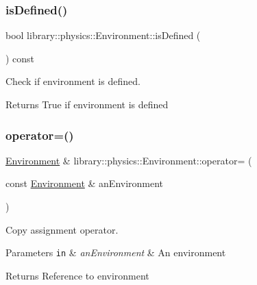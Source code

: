 \subsubsection{\texorpdfstring{is\+Defined()}{isDefined()}}
{\footnotesize\ttfamily bool library\+::physics\+::\+Environment\+::is\+Defined (\begin{DoxyParamCaption}{ }\end{DoxyParamCaption}) const}



Check if environment is defined. 

\begin{DoxyReturn}{Returns}
True if environment is defined 
\end{DoxyReturn}
\mbox{\label{classlibrary_1_1physics_1_1_environment_a3410b331642161ad087d76b7d5019a86}} 
\subsubsection{\texorpdfstring{operator=()}{operator=()}}
{\footnotesize\ttfamily \hyperlink{classlibrary_1_1physics_1_1_environment}{Environment} \& library\+::physics\+::\+Environment\+::operator= (\begin{DoxyParamCaption}\item[{const \hyperlink{classlibrary_1_1physics_1_1_environment}{Environment} \&}]{an\+Environment }\end{DoxyParamCaption})}



Copy assignment operator. 


\begin{DoxyParams}[1]{Parameters}
\mbox{\tt in}  & {\em an\+Environment} & An environment \\
\hline
\end{DoxyParams}
\begin{DoxyReturn}{Returns}
Reference to environment 
\end{DoxyReturn}
\mbox{\label{classlibrary_1_1physics_1_1_environment_a6279d44965a3894993cee2bc0c51d068}} 
